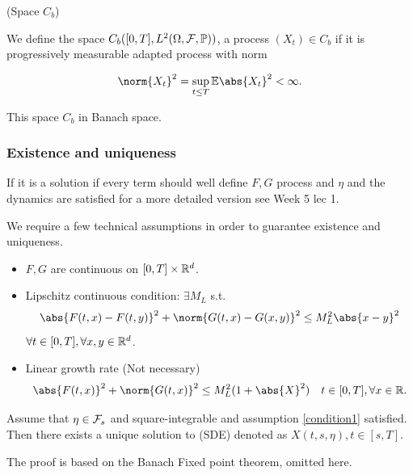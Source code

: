 \begin{dfn}{(Space $C_b$)}

We define the space $C_b([0,T], L^{2}(\Omega,\mathcal{F},\mathbb{P}))$, a process $(X_t)\in C_b$ if it is progressively measurable adapted process with norm

\begin{equation*}
    \norm{X_t}^2 = \sup_{t\leq T}\E\abs{X_t}^2 <\infty.
\end{equation*}

\end{dfn}

\begin{rem}
This space $C_b$ in Banach space.
\end{rem}

\subsubsection{Existence and uniqueness}
If it is a solution if every term should well define $F,G$ process and $\eta$ and the dynamics are satisfied for a more detailed version see Week 5 lec 1.

\begin{assmp}\label{condition1}

We require a few technical assumptions in order to guarantee existence and uniqueness.
\begin{itemize}
    \item $F,G$ are continuous on $[0,T]\times \mathbb{R}^d$.
    \item Lipschitz continuous condition: $\exists M_L$ s.t.
    \begin{equation*}
        \abs{F(t,x)-F(t,y)}^2 + \norm{G(t,x)-G(x,y)}^2 \leq M_L^2 \abs{x-y}^2
    \end{equation*} $\forall t\in[0,T], \forall x,y\in \mathbb{R}^d$.
    \item Linear growth rate (Not necessary)
    \begin{equation*}
        \abs{F(t,x)}^2 + \norm{G(t,x)}^2 \leq M_L^2(1+\abs{X}^2) \quad t\in[0,T], \forall x\in \R.
    \end{equation*}
\end{itemize}
\end{assmp}

\begin{thm}
Assume that $\eta\in\mathcal{F}_s$ and square-integrable and assumption \ref{condition1} satisfied. Then there exists a unique solution to (SDE) denoted as $X(t,s,\eta), t\in[s,T]$.
\end{thm}
The proof is based on the Banach Fixed point theorem, omitted here.

